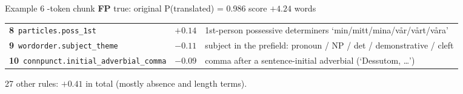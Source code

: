 \begin{exbox}[]{Example 6 -token chunk \quad \textbf{FP} \quad true: original \quad P(translated) = 0.986 \quad score $+4.24$  words}
{\begin{tabularx}{\linewidth}{@{}l r X@{}}
\textbf{8}~\texttt{particles.poss\_1st} & $+0.14$ & 1st-person possessive determiners `min/mitt/mina/vår/vårt/våra' \\
\textbf{9}~\texttt{wordorder.subject\_theme} & $-0.11$ & subject in the prefield: pronoun / NP / det / demonstrative / cleft \\
\textbf{10}~\texttt{connpunct.initial\_adverbial\_comma} & $-0.09$ & comma after a sentence-initial adverbial (`Dessutom, \ldots{}') \\
\end{tabularx}
\par 27 other rules: $+0.41$ in total (mostly absence and length terms).}
\par{}
\end{exbox}

